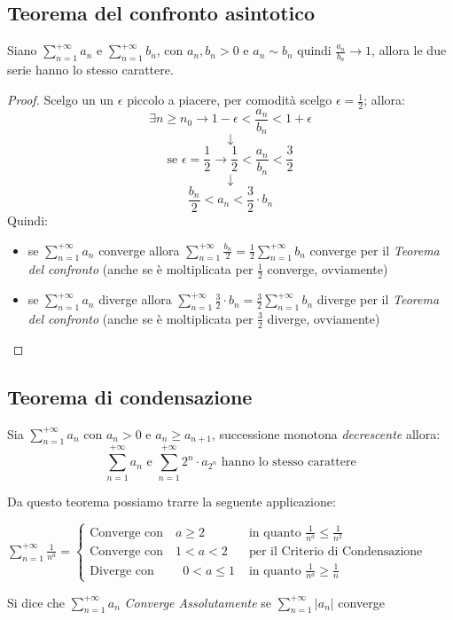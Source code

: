\documentclass[a4paper,12pt, oneside]{book}
\begin{document}
\subsection{Teorema del confronto asintotico}
\begin{teorema}
	Siano $\sum_{n=1}^{+\infty} a_n$ e $\sum_{n=1}^{+\infty} b_n$, con $a_n,b_n>0$ e $a_n\sim b_n \mbox{ quindi } \frac{a_n}{b_n}\rightarrow 1$, allora le due serie hanno lo stesso carattere.
\end{teorema}
\begin{proof}
	Scelgo un un $\epsilon$ piccolo a piacere, per comodità scelgo $\epsilon=\frac{1}{2}$; allora:
	$$\exists n\geq n_0\longrightarrow 1-\epsilon<\frac{a_n}{b_n}<1+\epsilon$$
	$$\downarrow$$
	$$\mbox{se  } \epsilon=\frac{1}{2}\longrightarrow \frac{1}{2}<\frac{a_n}{b_n}<\frac{3}{2}$$
	$$\downarrow$$
	$$\frac{b_n}{2}<a_n<\frac{3}{2}\cdot b_n$$
	Quindi:
	\begin{itemize}
		\item se $\sum_{n=1}^{+\infty} a_n$ converge allora $\sum_{n=1}^{+\infty} \frac{b_n}{2} = \frac{1}{2}\sum_{n=1}^{+\infty} b_n$ converge per il \textit{Teorema del confronto} (anche se è moltiplicata per $\frac{1}{2}$ converge, ovviamente)
		\item se $\sum_{n=1}^{+\infty} a_n$ diverge allora $\sum_{n=1}^{+\infty} \frac{3}{2}\cdot b_n = \frac{3}{2}\sum_{n=1}^{+\infty} b_n$ diverge per il \textit{Teorema del confronto} (anche se è moltiplicata per $\frac{3}{2}$ diverge, ovviamente)
	\end{itemize}
\end{proof}
\subsection{Teorema di condensazione}
\begin{teorema}
	Sia $\sum_{n=1}^{+\infty} a_n$ con $a_n>0$ e $a_n\geq a_{n+1}$, successione monotona \textit{decrescente} allora:
	$$\sum_{n=1}^{+\infty} a_n \mbox{  e  } \sum_{n=1}^{+\infty} 2^n\cdot a_{2^n} \mbox{  hanno lo stesso carattere}$$
\end{teorema}
Da questo teorema possiamo trarre la seguente applicazione:
\begin{center}
	$\sum_{n=1}^{+\infty} \frac{1}{n^a}=\left\{
		\begin{array}{ll}
			\mbox{Converge con  } \mbox{ } a\geq 2                     & \mbox{  in quanto  }\frac{1}{n^a}\leq \frac{1}{n^2} \\
			\mbox{Converge con  } \mbox{ } 1<a<2                       & \mbox{  per il Criterio di Condensazione}           \\
			\mbox{Diverge con   } \mbox{ } \mbox{ } \mbox{ } 0<a\leq 1 & \mbox{  in quanto  }\frac{1}{n^a}\geq \frac{1}{n}
		\end{array}
		\right.$
\end{center}
Si dice che $\sum_{n=1}^{+\infty} a_n$ \textit{Converge Assolutamente} se $\sum_{n=1}^{+\infty} |a_n|$ converge
\end{document}
